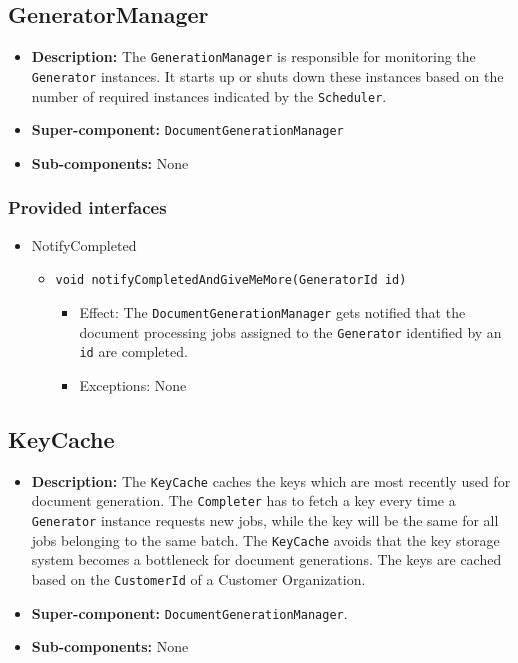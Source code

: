 \documentclass[a4paper,10pt]{article}
\begin{document}
\subsection{GeneratorManager}
\begin{itemize}
    \item \textbf{Description:} The \texttt{GenerationManager} is responsible for monitoring the \texttt{Generator} instances. It starts up or shuts down these instances based on the number of required instances indicated by the \texttt{Scheduler}.
    \item \textbf{Super-component:}  \texttt{DocumentGenerationManager}
    \item \textbf{Sub-components:} None
\end{itemize}

\subsubsection*{Provided interfaces}
\begin{itemize}
    \item NotifyCompleted
    \begin{itemize}
        \item \texttt{void notifyCompletedAndGiveMeMore(GeneratorId id)}
        \begin{itemize}
            \item Effect: The \texttt{DocumentGenerationManager} gets notified that the document processing jobs assigned to the \texttt{Generator} identified by an \texttt{id} are completed. 
            \item Exceptions: None
        \end{itemize}
    \end{itemize}
\end{itemize}

\subsection{KeyCache}
\begin{itemize}
    \item \textbf{Description:} The \texttt{KeyCache} caches the keys which are most recently used for document generation. The \texttt{Completer} has to fetch a key every time a \texttt{Generator} instance requests new jobs, while the key will be the same for all jobs belonging to the same batch. The \texttt{KeyCache} avoids that the key storage system becomes a bottleneck for document generations. The keys are cached based on the \texttt{CustomerId} of a Customer Organization.
    \item \textbf{Super-component:}  \texttt{DocumentGenerationManager}.
    \item \textbf{Sub-components:} None
\end{itemize}
\end{document}
